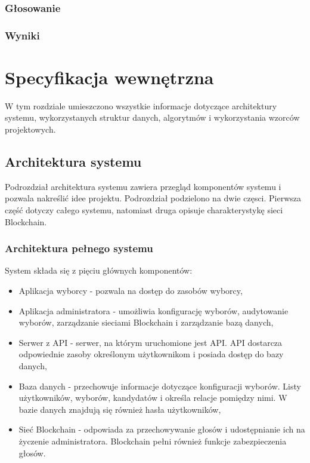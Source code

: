 \documentclass[a4paper,12pt]{book}
\begin{document}
\subsection{Głosowanie}

\subsection{Wyniki}


\chapter{Specyfikacja wewnętrzna}

W tym rozdziale umieszczono wszystkie informacje dotyczące architektury systemu, wykorzystanych struktur danych, algorytmów i wykorzystania wzorców projektowych.

\section{Architektura systemu}
Podrozdział architektura systemu zawiera przegląd komponentów systemu i pozwala nakreślić idee projektu. Podrozdział podzielono na dwie częsci. Pierwsza część dotyczy całego systemu, natomiast druga opisuje charakterystykę sieci Blockchain.

\subsection{Architektura pełnego systemu}

System składa się z pięciu głównych komponentów:
\begin {itemize}
	\item Aplikacja wyborcy - pozwala na dostęp do zasobów wyborcy,
	\item Aplikacja administratora - umożliwia konfigurację wyborów, audytowanie wyborów, zarządzanie sieciami Blockchain i zarządzanie bazą danych,
	\item Serwer z API - serwer, na którym uruchomione jest API. API dostarcza odpowiednie zasoby określonym użytkownikom i posiada dostęp do bazy danych,
	\item Baza danych - przechowuje informacje dotyczące konfiguracji wyborów. Listy użytkowników, wyborów, kandydatów i określa relacje pomiędzy nimi. W bazie danych znajdują się również hasła użytkowników,
	\item Sieć Blockchain - odpowiada za przechowywanie głosów i udostępnianie ich na życzenie administratora. Blockchain pełni również funkcje zabezpieczenia głosów.
\end {itemize}
\end{document}
